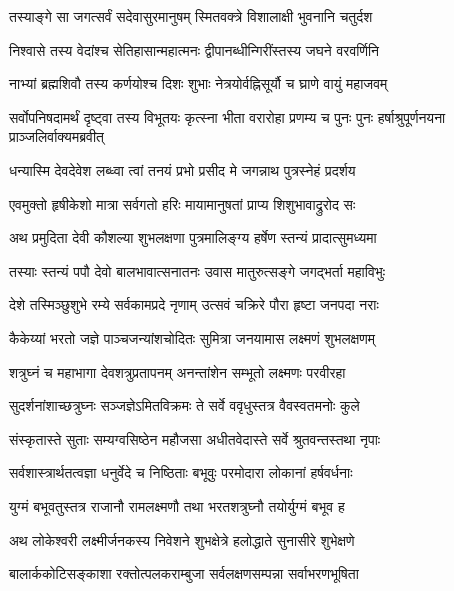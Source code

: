 \twolineshloka
{तस्याङ्गे सा जगत्सर्वं सदेवासुरमानुषम्}
{स्मितवक्त्रे विशालाक्षी भुवनानि चतुर्दश}%

\twolineshloka
{निश्वासे तस्य वेदांश्च सेतिहासान्महात्मनः}
{द्वीपानब्धीन्गिरींस्तस्य जघने वरवर्णिनि}%

\twolineshloka
{नाभ्यां ब्रह्मशिवौ तस्य कर्णयोश्च दिशः शुभाः}
{नेत्रयोर्वह्निसूर्यौ च घ्राणे वायुं महाजवम्}%


\threelineshloka
{सर्वोपनिषदामर्थं दृष्ट्वा तस्य विभूतयः}
{कृत्स्ना भीता वरारोहा प्रणम्य च पुनः पुनः}
{हर्षाश्रुपूर्णनयना प्राञ्जलिर्वाक्यमब्रवीत्}%


\twolineshloka
{धन्यास्मि देवदेवेश लब्ध्वा त्वां तनयं प्रभो}
{प्रसीद मे जगन्नाथ पुत्रस्नेहं प्रदर्शय}%


\twolineshloka
{एवमुक्तो हृषीकेशो मात्रा सर्वगतो हरिः}
{मायामानुषतां प्राप्य शिशुभावाद्रुरोद सः}%

\twolineshloka
{अथ प्रमुदिता देवी कौशल्या शुभलक्षणा}
{पुत्रमालिङ्ग्य हर्षेण स्तन्यं प्रादात्सुमध्यमा}%

\twolineshloka
{तस्याः स्तन्यं पपौ देवो बालभावात्सनातनः}
{उवास मातुरुत्सङ्गे जगद्भर्ता महाविभुः}%

\twolineshloka
{देशे तस्मिञ्छुशुभे रम्ये सर्वकामप्रदे नृणाम्}
{उत्सवं चक्रिरे पौरा हृष्टा जनपदा नराः}%

\twolineshloka
{कैकेय्यां भरतो जज्ञे पाञ्चजन्यांशचोदितः}
{सुमित्रा जनयामास लक्ष्मणं शुभलक्षणम्}%

\twolineshloka
{शत्रुघ्नं च महाभागा देवशत्रुप्रतापनम्}
{अनन्तांशेन सम्भूतो लक्ष्मणः परवीरहा}%

\twolineshloka
{सुदर्शनांशाच्छत्रुघ्नः सञ्जज्ञेऽमितविक्रमः}
{ते सर्वे ववृधुस्तत्र वैवस्वतमनोः कुले}%

\twolineshloka
{संस्कृतास्ते सुताः सम्यग्वसिष्ठेन महौजसा}
{अधीतवेदास्ते सर्वे श्रुतवन्तस्तथा नृपाः}%

\twolineshloka
{सर्वशास्त्रार्थतत्वज्ञा धनुर्वेदे च निष्ठिताः}
{बभूवुः परमोदारा लोकानां हर्षवर्धनाः}%

\twolineshloka
{युग्मं बभूवतुस्तत्र राजानौ रामलक्ष्मणौ}
{तथा भरतशत्रुघ्नौ तयोर्युग्मं बभूव ह}%

\twolineshloka
{अथ लोकेश्वरी लक्ष्मीर्जनकस्य निवेशने}
{शुभक्षेत्रे हलोद्धाते सुनासीरे शुभेक्षणे}%

\twolineshloka
{बालार्ककोटिसङ्काशा रक्तोत्पलकराम्बुजा}
{सर्वलक्षणसम्पन्ना सर्वाभरणभूषिता}%

